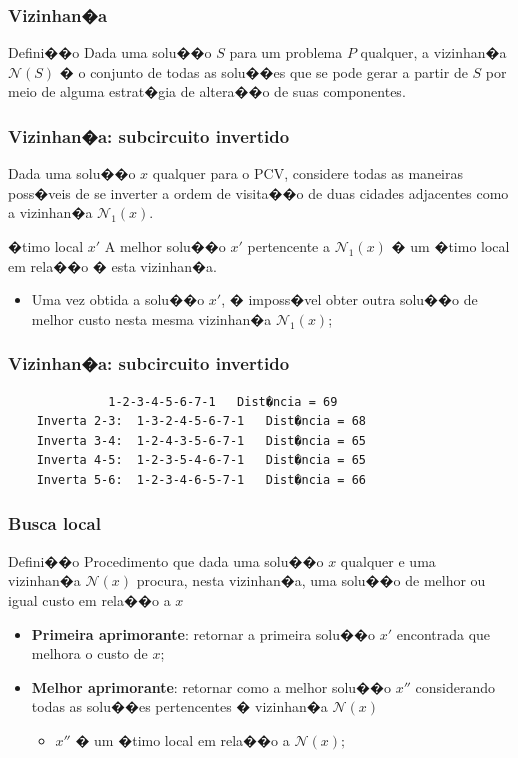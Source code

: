 \documentclass[fleqn]{beamer}
\begin{document}
\begin{frame}
	\frametitle{Vizinhan�a}
	\begin{block}{Defini��o}
	Dada uma solu��o $S$ para um problema $P$ qualquer, a vizinhan�a $\mathcal{N}(S)$ � o conjunto de todas as solu��es que se pode gerar a partir de $S$ por meio de alguma estrat�gia de altera��o de suas componentes.
	\end{block}
\end{frame}
\begin{frame}
	\frametitle{Vizinhan�a: subcircuito invertido}
	Dada uma solu��o $x$ qualquer para o PCV, considere todas as maneiras poss�veis de se inverter a ordem de visita��o de duas cidades adjacentes como a vizinhan�a $\mathcal{N}_1(x)$.
	\begin{block}{�timo local $x'$}
		A melhor solu��o $x'$ pertencente a $\mathcal{N}_1(x)$ � um �timo local em rela��o � esta vizinhan�a.
		\begin{itemize}
			\item Uma vez obtida a solu��o $x'$, � imposs�vel obter outra solu��o de melhor custo nesta mesma vizinhan�a $\mathcal{N}_1(x)$;
		\end{itemize}
	\end{block}
\end{frame}
\begin{frame}[fragile]
	\frametitle{Vizinhan�a: subcircuito invertido}
	\begin{Verbatim}
	    	  1-2-3-4-5-6-7-1   Dist�ncia = 69
	Inverta 2-3:  1-3-2-4-5-6-7-1   Dist�ncia = 68
	Inverta 3-4:  1-2-4-3-5-6-7-1   Dist�ncia = 65	
	Inverta 4-5:  1-2-3-5-4-6-7-1   Dist�ncia = 65
	Inverta 5-6:  1-2-3-4-6-5-7-1   Dist�ncia = 66
	\end{Verbatim}
\end{frame}
\begin{frame}
	\frametitle{Busca local}
	\begin{block}{Defini��o}
		Procedimento que dada uma solu��o $x$ qualquer e uma vizinhan�a $\mathcal{N}(x)$ procura, nesta vizinhan�a, uma solu��o de melhor ou igual custo em rela��o a $x$
	\end{block}
	\begin{itemize}
		\item \textbf{Primeira aprimorante}: retornar a primeira solu��o $x'$ encontrada que melhora o custo de $x$;
		\item \textbf{Melhor aprimorante}: retornar como a melhor solu��o $x''$ considerando todas as solu��es pertencentes � vizinhan�a $\mathcal{N}(x)$
			\begin{itemize}
				\item $x''$ � um �timo local em rela��o a $\mathcal{N}(x);$
			\end{itemize} 
	\end{itemize}
\end{frame}
\end{document}
